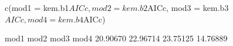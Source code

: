 \begin{Schunk}
\begin{Sinput}
 c(mod1 = kem.b1$AICc, mod2 = kem.b2$AICc, 
   mod3 = kem.b3$AICc, mod4 = kem.b4$AICc)
\end{Sinput}
\begin{Soutput}
    mod1     mod2     mod3     mod4 
20.90670 22.96714 23.75125 14.76889 
\end{Soutput}
\end{Schunk}
